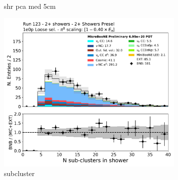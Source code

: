 \begin{figure}[H]
\begin{subfigure}{0.3\textwidth}
    \caption{shr pca med 5cm}
    \end{subfigure}
    \begin{subfigure}{0.3\textwidth}
    \includegraphics[width=1.0\textwidth]{Sidebands/Figures/TwoShr_1e0pSel/loose/subcluster.pdf}
    \caption{subcluster}
    \end{subfigure}
    \caption{} 
    \label{fig:HE_1eNp_1}
\end{figure}

